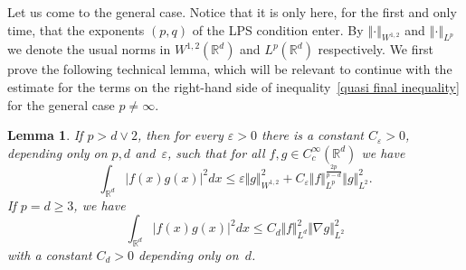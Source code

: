 \documentclass[a4paper,10pt]{article}
\newtheorem{lemma}[theorem]{Lemma}
\newcommand\1{\mathbbm{1}}
\newcommand{\eps}{\varepsilon}
\numberwithin{equation}{section}
\begin{document}
Let us come to the general case. Notice that it is only here, for the first and only time, that the exponents $(p,q)$ of the LPS condition enter. By $\left\Vert \cdot\right\Vert _{W^{1,2}}$ and $\left\Vert \cdot\right\Vert _{L^{p}}$ we denote the usual norms in $W^{1,2}(\mathbb{R}^{d})$ and $L^{p}(\mathbb{R}^{d})$ respectively. We first prove the following technical lemma, which will be relevant to continue with the estimate for the terms on the right-hand side of inequality~\eqref{quasi final inequality} for the general case $p \neq \infty$.

\begin{lemma}
\label{lemma interpolation}If $p>d\vee2$, then for every $\varepsilon>0$ there
is a constant $C_{\varepsilon}>0$, depending only on $p,d$ and~$\eps$, such that for all $f,g\in C_{c}^{\infty
}(\mathbb{R}^{d})$ we have 
\begin{equation}
\int_{\mathbb{R}^{d}}\vert f(x)  g(x) \vert^{2}dx\leq\varepsilon \Vert g\Vert_{W^{1,2}} 
^{2}+C_{\varepsilon} \Vert f \Vert_{L^{p}}^{\frac{2p}{p-d} 
} \Vert g \Vert_{L^{2}}^{2}. \label{interpol ineq} 
\end{equation}
If $p=d\geq3$, we have
\begin{equation}
\int_{\mathbb{R}^{d}} \vert f(x)  g(x)
 \vert^{2}dx\leq C_{d} \Vert f \Vert _{L^{d}}^{2} \Vert
\nabla g \Vert _{L^{2}}^{2} \label{interpol ineq p=d} 
\end{equation}
with a constant $C_{d}>0$ depending only on~$d$.
\end{lemma}
\end{document}
